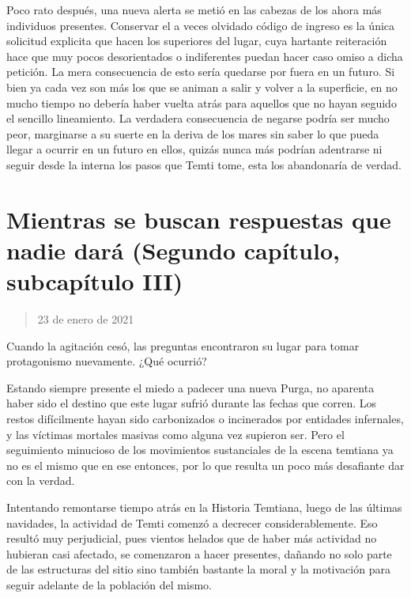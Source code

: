 \documentclass[
  spanish,
]{book}
\begin{document}
Poco rato después, una nueva alerta se metió en las cabezas de los ahora más individuos presentes. Conservar el a veces olvidado código de ingreso es la única solicitud explicita que hacen los superiores del lugar, cuya hartante reiteración hace que muy pocos desorientados o indiferentes puedan hacer caso omiso a dicha petición. La mera consecuencia de esto sería quedarse por fuera en un futuro. Si bien ya cada vez son más los que se animan a salir y volver a la superficie, en no mucho tiempo no debería haber vuelta atrás para aquellos que no hayan seguido el sencillo lineamiento. La verdadera consecuencia de negarse podría ser mucho peor, marginarse a su suerte en la deriva de los mares sin saber lo que pueda llegar a ocurrir en un futuro en ellos, quizás nunca más podrían adentrarse ni seguir desde la interna los pasos que Temti tome, esta los abandonaría de verdad.

\hypertarget{mientras-se-buscan-respuestas-que-nadie-daruxe1-segundo-capuxedtulo-subcapuxedtulo-iii}{%
\section{Mientras se buscan respuestas que nadie dará (Segundo capítulo, subcapítulo III)}\label{mientras-se-buscan-respuestas-que-nadie-daruxe1-segundo-capuxedtulo-subcapuxedtulo-iii}}

\begin{quote}
23 de enero de 2021
\end{quote}

Cuando la agitación cesó, las preguntas encontraron su lugar para tomar protagonismo nuevamente. ¿Qué ocurrió?

Estando siempre presente el miedo a padecer una nueva Purga, no aparenta haber sido el destino que este lugar sufrió durante las fechas que corren. Los restos difícilmente hayan sido carbonizados o incinerados por entidades infernales, y las víctimas mortales masivas como alguna vez supieron ser. Pero el seguimiento minucioso de los movimientos sustanciales de la escena temtiana ya no es el mismo que en ese entonces, por lo que resulta un poco más desafiante dar con la verdad.

Intentando remontarse tiempo atrás en la Historia Temtiana, luego de las últimas navidades, la actividad de Temti comenzó a decrecer considerablemente. Eso resultó muy perjudicial, pues vientos helados que de haber más actividad no hubieran casi afectado, se comenzaron a hacer presentes, dañando no solo parte de las estructuras del sitio sino también bastante la moral y la motivación para seguir adelante de la población del mismo.
\end{document}

